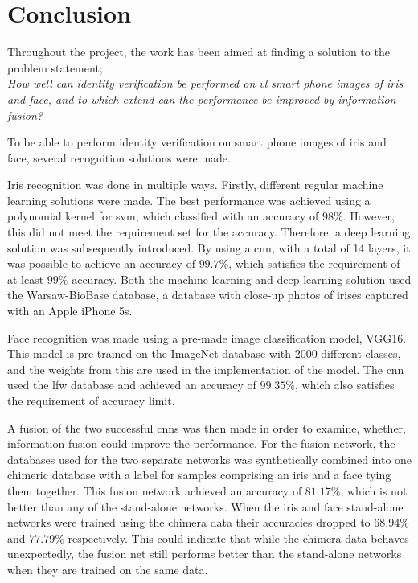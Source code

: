 \chapter{Conclusion}\label{ch:conclusion}\glsresetall
Throughout the project, the work has been aimed at finding a solution to the problem statement; \\
\textit{How well can identity verification be performed on \gls{vl} smart phone images of iris and face, and to which extend can the performance be improved by information fusion?}

To be able to perform identity verification on smart phone images of iris and face, several recognition solutions were made.

Iris recognition was done in multiple ways. Firstly, different regular machine learning solutions were made. The best performance was achieved using a polynomial kernel for \gls{svm}, which classified with an accuracy of $98\%$. However, this did not meet the requirement set for the accuracy. Therefore, a deep learning solution was subsequently introduced. By using a \gls{cnn}, with a total of 14 layers, it was possible to achieve an accuracy of $99.7\%$, which satisfies the requirement of at least $99\%$ accuracy. 
Both the machine learning and deep learning solution used the Warsaw-BioBase database, a database with close-up photos of irises captured with an Apple iPhone 5s.

Face recognition was made using a pre-made image classification model, VGG16. This model is pre-trained on the ImageNet database with 2000 different classes, and the weights from this are used in the implementation of the model. The \gls{cnn} used the \gls{lfw} database and achieved an accuracy of $99.35\%$, which also satisfies the requirement of accuracy limit.

A fusion of the two successful \gls{cnn}s was then made in order to examine, whether, information fusion could improve the performance. For the fusion network, the databases used for the two separate networks was synthetically combined into one chimeric database with a label for samples comprising an iris and a face tying them together. This fusion network achieved an accuracy of $81.17\%$, which is not better than any of the stand-alone networks. When the iris and face stand-alone networks were trained using the chimera data their accuracies dropped to $68.94\%$ and $77.79\%$ respectively. This could indicate that while the chimera data behaves unexpectedly, the fusion net still performs better than the stand-alone networks when they are trained on the same data.